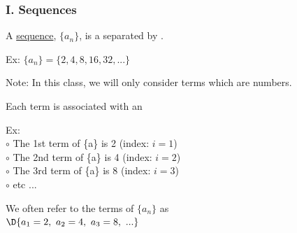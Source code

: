 \begin{frame}
\frametitle{I. Sequences}
\scriptsize
A \underline{sequence}, $\{a_n\}$, is a  separated by . \\

\vspace{0.5cm}

Ex: $\{a_n\} = \{2, 4,  8, 16, 32, ...\}$ \\

\vspace{0.8cm}

Note: In this class, we will only consider terms which are numbers. \\

\vspace{0.8cm}

Each term is associated with an 

\vspace{0.5cm}

Ex: \\

\hspace{1.0cm} $\circ$ The 1st term of \{a\} is 2 \quad (index: $i=1$)\\
\hspace{1.0cm} $\circ$ The 2nd term of \{a\} is 4 \quad (index: $i=2$)\\
\hspace{1.0cm} $\circ$ The 3rd term of \{a\} is 8 \quad (index: $i=3$)\\
\hspace{1.0cm} $\circ$ etc ...

\vspace{0.8cm}

We often refer to the terms of $\{a_n\}$ as \\
\vspace{0.2cm}
$\D{a_1 = 2, \,\,a_2 = 4, \,\,a_3 = 8, \,\,...}$

\vspace{0.4cm}

\end{frame}

